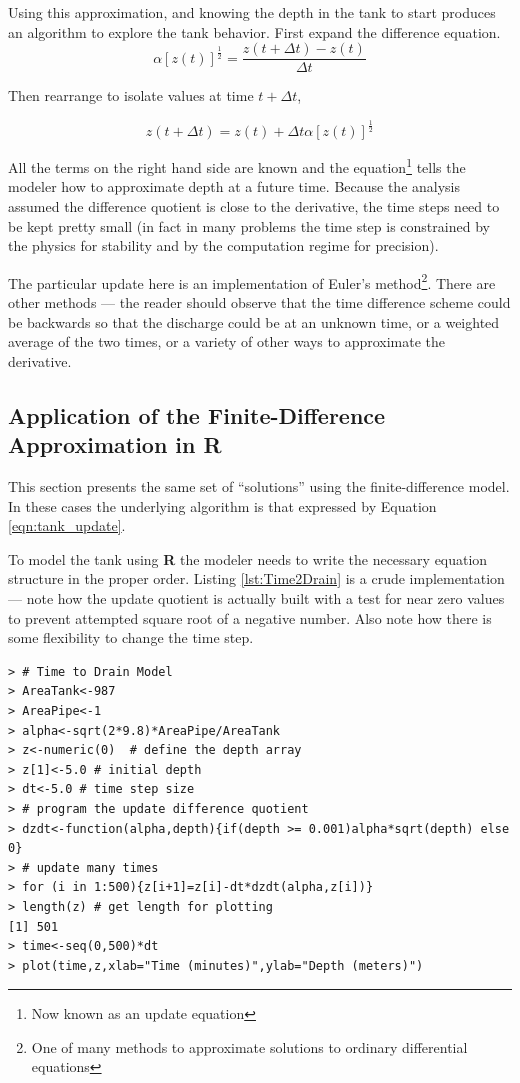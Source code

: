 Using this approximation, and knowing the depth in the tank to start produces an algorithm to explore the tank behavior.  First expand the difference equation.
\begin{equation}
\alpha  [z(t)]^{\frac{1}{2}}= \frac{z(t+\Delta t) - z(t) }{\Delta t}
\label{eqn:tank_expanded_fda}
\end{equation}

Then rearrange to isolate values at time $t+\Delta t$,

\begin{equation}
{z(t+\Delta t) } = z(t) + \Delta t \alpha  [z(t)]^{\frac{1}{2}}
\label{eqn:tank_update}
\end{equation}

All the terms on the right hand side are known and the equation\footnote{Now known as an update equation} tells the modeler how to approximate depth at a future time.  Because the analysis assumed the difference quotient is close to the derivative, the time steps need to be kept pretty small (in fact in many problems the time step is constrained by the physics for stability and by the computation regime for precision).

The particular update here is an implementation of Euler's method\footnote{One of many methods to approximate solutions to ordinary differential equations}.  There are other methods --- the reader should observe that the time difference scheme could be backwards so that the discharge could be at an unknown time, or a weighted average of the two times, or a variety of other ways to approximate the derivative.




\subsection{Application of the Finite-Difference Approximation in \textbf{R}}
This section presents the same set of ``solutions'' using the finite-difference model.  In these cases the underlying algorithm is that expressed by Equation \ref{eqn:tank_update}.

To model the tank using \textbf{R} the modeler needs to write the necessary equation structure in the proper order.  Listing \ref{lst:Time2Drain} is a crude implementation --- note how the update quotient is actually built with a test for near zero values to prevent attempted square root of a negative number.   
Also note how there is some flexibility to change the time step.

\begin{lstlisting}[caption=R code demonstrating time to drain calculations, label=lst:Time2Drain]
> # Time to Drain Model
> AreaTank<-987
> AreaPipe<-1
> alpha<-sqrt(2*9.8)*AreaPipe/AreaTank
> z<-numeric(0)  # define the depth array
> z[1]<-5.0 # initial depth
> dt<-5.0 # time step size
> # program the update difference quotient
> dzdt<-function(alpha,depth){if(depth >= 0.001)alpha*sqrt(depth) else 0}
> # update many times
> for (i in 1:500){z[i+1]=z[i]-dt*dzdt(alpha,z[i])}
> length(z) # get length for plotting
[1] 501
> time<-seq(0,500)*dt
> plot(time,z,xlab="Time (minutes)",ylab="Depth (meters)")
\end{lstlisting}  

